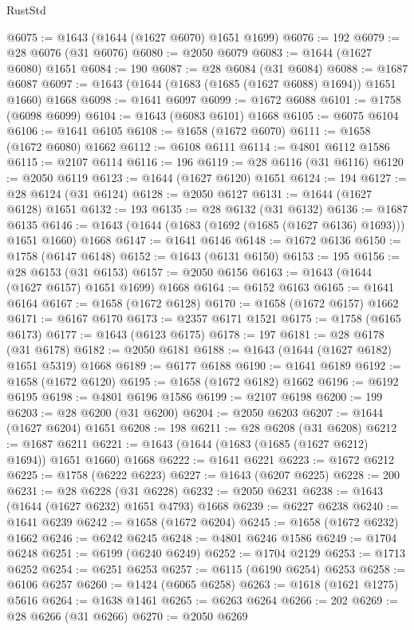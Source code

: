 \begin{lexlean}{RustStd}
\begin{coremodule}
@6075 := @1643 (@1644 (@1627 @6070) @1651 @1699)
@6076 := 192
@6079 := @28 @6076 (@31 @6076)
@6080 := @2050 @6079
@6083 := @1644 (@1627 @6080) @1651
@6084 := 190
@6087 := @28 @6084 (@31 @6084)
@6088 := @1687 @6087
@6097 := @1643 (@1644 (@1683 (@1685 (@1627 @6088) @1694)) @1651 @1660) @1668
@6098 := @1641 @6097
@6099 := @1672 @6088
@6101 := @1758 (@6098 @6099)
@6104 := @1643 (@6083 @6101) @1668
@6105 := @6075 @6104
@6106 := @1641 @6105
@6108 := @1658 (@1672 @6070)
@6111 := @1658 (@1672 @6080) @1662
@6112 := @6108 @6111
@6114 := @4801 @6112 @1586
@6115 := @2107 @6114
@6116 := 196
@6119 := @28 @6116 (@31 @6116)
@6120 := @2050 @6119
@6123 := @1644 (@1627 @6120) @1651
@6124 := 194
@6127 := @28 @6124 (@31 @6124)
@6128 := @2050 @6127
@6131 := @1644 (@1627 @6128) @1651
@6132 := 193
@6135 := @28 @6132 (@31 @6132)
@6136 := @1687 @6135
@6146 := @1643 (@1644 (@1683 (@1692 (@1685 (@1627 @6136) @1693))) @1651 @1660) @1668
@6147 := @1641 @6146
@6148 := @1672 @6136
@6150 := @1758 (@6147 @6148)
@6152 := @1643 (@6131 @6150)
@6153 := 195
@6156 := @28 @6153 (@31 @6153)
@6157 := @2050 @6156
@6163 := @1643 (@1644 (@1627 @6157) @1651 @1699) @1668
@6164 := @6152 @6163
@6165 := @1641 @6164
@6167 := @1658 (@1672 @6128)
@6170 := @1658 (@1672 @6157) @1662
@6171 := @6167 @6170
@6173 := @2357 @6171 @1521
@6175 := @1758 (@6165 @6173)
@6177 := @1643 (@6123 @6175)
@6178 := 197
@6181 := @28 @6178 (@31 @6178)
@6182 := @2050 @6181
@6188 := @1643 (@1644 (@1627 @6182) @1651 @5319) @1668
@6189 := @6177 @6188
@6190 := @1641 @6189
@6192 := @1658 (@1672 @6120)
@6195 := @1658 (@1672 @6182) @1662
@6196 := @6192 @6195
@6198 := @4801 @6196 @1586
@6199 := @2107 @6198
@6200 := 199
@6203 := @28 @6200 (@31 @6200)
@6204 := @2050 @6203
@6207 := @1644 (@1627 @6204) @1651
@6208 := 198
@6211 := @28 @6208 (@31 @6208)
@6212 := @1687 @6211
@6221 := @1643 (@1644 (@1683 (@1685 (@1627 @6212) @1694)) @1651 @1660) @1668
@6222 := @1641 @6221
@6223 := @1672 @6212
@6225 := @1758 (@6222 @6223)
@6227 := @1643 (@6207 @6225)
@6228 := 200
@6231 := @28 @6228 (@31 @6228)
@6232 := @2050 @6231
@6238 := @1643 (@1644 (@1627 @6232) @1651 @4793) @1668
@6239 := @6227 @6238
@6240 := @1641 @6239
@6242 := @1658 (@1672 @6204)
@6245 := @1658 (@1672 @6232) @1662
@6246 := @6242 @6245
@6248 := @4801 @6246 @1586
@6249 := @1704 @6248
@6251 := @6199 (@6240 @6249)
@6252 := @1704 @2129
@6253 := @1713 @6252
@6254 := @6251 @6253
@6257 := @6115 (@6190 @6254) @6253
@6258 := @6106 @6257
@6260 := @1424 (@6065 @6258)
@6263 := @1618 (@1621 @1275) @5616
@6264 := @1638 @1461
@6265 := @6263 @6264
@6266 := 202
@6269 := @28 @6266 (@31 @6266)
@6270 := @2050 @6269

\end{coremodule}
\end{lexlean}
